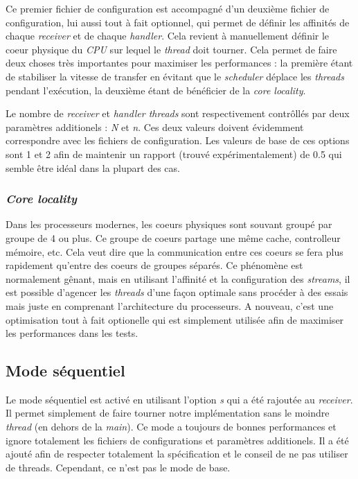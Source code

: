 \documentclass[../main.tex]{subfiles}
\begin{document}
Ce premier fichier de configuration est accompagné d'un deuxième fichier de configuration, lui aussi tout à fait optionnel, qui permet de définir les affinités
de chaque \textit{receiver} et de chaque \textit{handler}. Cela revient à manuellement définir le coeur physique du \textit{CPU} sur lequel le \textit{thread}
doit tourner. Cela permet de faire deux choses très importantes pour maximiser les performances : la première étant de stabiliser la vitesse de transfer 
en évitant que le \textit{scheduler} déplace les \textit{threads} pendant l'exécution, la deuxième étant de bénéficier de la \textit{core locality}. 

Le nombre de \textit{receiver} et \textit{handler threads} sont respectivement contrôllés par deux paramètres additionels : \textit{N} et \textit{n}. Ces deux
valeurs doivent évidemment correspondre avec les fichiers de configuration. Les valeurs de base de ces options sont 1 et 2 afin de maintenir un rapport 
(trouvé expérimentalement) de 0.5 qui semble être idéal dans la plupart des cas.


\subsubsection{\textit{Core locality}}

Dans les processeurs modernes, les coeurs physiques sont souvant groupé par groupe de 4 ou plus. Ce groupe de coeurs partage une même cache, controlleur mémoire, etc.
Cela veut dire que la communication entre ces coeurs se fera plus rapidement qu'entre des coeurs de groupes séparés. Ce phénomène est normalement gênant, mais
en utilisant l'affinité et la configuration des \textit{streams}, il est possible d'agencer les \textit{threads} d'une façon optimale sans procéder à des essais
mais juste en comprenant l'architecture du processeurs. A nouveau, c'est une optimisation tout à fait optionelle qui est simplement utilisée afin de maximiser
les performances dans les tests.

\subsection{Mode séquentiel}
\label{sec:sequential}

Le mode séquentiel est activé en utilisant l'option \textit{s} qui a été rajoutée au \textit{receiver}. Il permet simplement de faire 
tourner notre implémentation sans le moindre \textit{thread} (en dehors de la \textit{main}). Ce mode a toujours de bonnes performances et ignore totalement 
les fichiers de configurations et paramètres additionels. Il a été ajouté afin de respecter totalement la spécification et le conseil de ne pas utiliser de 
threads. Cependant, ce n'est pas le mode de base.
\end{document}
